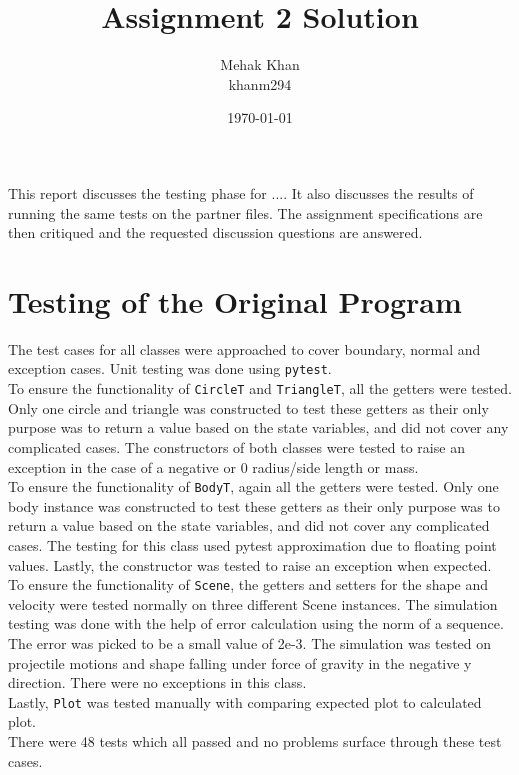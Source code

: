 \documentclass[12pt]{article}
\title{Assignment 2 Solution}
\author{Mehak Khan \\ khanm294 }
\date{\today}
\begin{document}
\maketitle

This report discusses the testing phase for .... It also discusses the results
of running the same tests on the partner files. The assignment specifications
are then critiqued and the requested discussion questions are answered.

\section{Testing of the Original Program}
The test cases for all classes were approached to cover boundary, normal and exception cases. Unit testing was done using \texttt{pytest}.\\
\indent To ensure the functionality of \texttt{CircleT} and \texttt{TriangleT}, all the getters were tested. Only one circle and triangle was constructed to test these getters as their only purpose was to return a value based on the state variables, and did not cover any complicated cases. The constructors of both classes were tested to raise an exception in the case of a negative or 0 radius/side length or mass.\\
\indent To ensure the functionality of \texttt{BodyT}, again all the getters were tested. Only one body instance was constructed to test these getters as their only purpose was to return a value based on the state variables, and did not cover any complicated cases. The testing for this class used pytest approximation due to floating point values. Lastly, the constructor was tested to raise an exception when expected.\\
\indent To ensure the functionality of \texttt{Scene}, the getters and setters for the shape and velocity were tested normally on three different Scene instances. The simulation testing was done with the help of error calculation using the norm of a sequence. The error was picked to be a small value of 2e-3. The simulation was tested on projectile motions and shape falling under force of gravity in the negative y direction. There were no exceptions in this class.\\ 
\indent Lastly, \texttt{Plot} was tested manually with comparing expected plot to calculated plot.\\
\indent There were 48 tests which all passed and no problems surface through these test cases.
\end{document}
